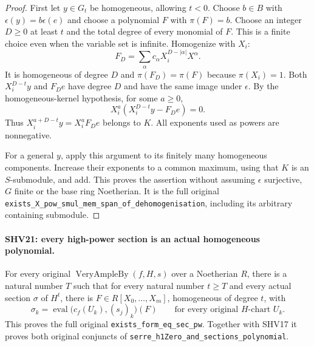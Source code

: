 \documentclass[11pt,a4paper]{article}
\numberwithin{equation}{section}
\theoremstyle{remark}\newtheorem{remark}[theorem]{Remark}
\begin{document}
\begin{proof}
First let $y\in G_t$ be homogeneous, allowing $t<0$.
Choose $b\in B$ with $\epsilon(y)=b\epsilon(e)$ and choose
a polynomial $F$ with $\pi(F)=b$.
Choose an integer $D\ge0$ at least $t$ and the total degree
of every monomial of $F$.  This is a finite choice even
when the variable set is infinite.  Homogenize with $X_i$:
\[
 F_D=\sum_\alpha c_\alpha X_i^{D-|\alpha|}X^\alpha .
                                                        \tag{SHV.30}
\]
It is homogeneous of degree $D$ and $\pi(F_D)=\pi(F)$
because $\pi(X_i)=1$.
Both $X_i^{D-t}y$ and $F_D e$ have degree $D$ and have
the same image under $\epsilon$.
By the homogeneous-kernel hypothesis, for some $a\ge0$,
\[
 X_i^a(X_i^{D-t}y-F_D e)=0.
\]
Thus $X_i^{a+D-t}y=X_i^aF_D e$ belongs to $K$.
All exponents used as powers are nonnegative.

For a general $y$, apply this argument to its finitely many
homogeneous components.  Increase their exponents to a common
maximum, using that $K$ is an $S$-submodule, and add.
This proves the assertion without assuming $\epsilon$
surjective, $G$ finite or the base ring Noetherian.
It is the full original
\texttt{exists\_\allowbreak X\_\allowbreak pow\_\allowbreak smul\_\allowbreak mem\_\allowbreak span\_\allowbreak of\_\allowbreak dehomogenisation},
including its arbitrary containing submodule.
\end{proof}

\paragraph{SHV21: every high-power section is an actual homogeneous polynomial.}
\label{claim:SHV21}
For every original $\operatorname{VeryAmpleBy}(f,H,s)$ over
a Noetherian $R$, there is a natural number $T$ such that
for every natural number $t\ge T$ and every actual section
$\sigma$ of $H^t$, there is $F\in R[X_0,\ldots,X_m]$,
homogeneous of degree $t$, with
\[
 \sigma_k=
  \operatorname{eval}\bigl(c_f(U_k),(s_j)_k\bigr)(F)
                 \qquad\text{for every original }H\text{-chart }U_k.
                                                        \tag{SHV.31}
\]
This proves the full original \texttt{exists\_\allowbreak form\_\allowbreak eq\_\allowbreak sec\_\allowbreak pw}.
Together with SHV17 it proves both original conjuncts of
\texttt{serre\_\allowbreak h1Zero\_\allowbreak and\_\allowbreak sections\_\allowbreak polynomial}.
\end{document}
